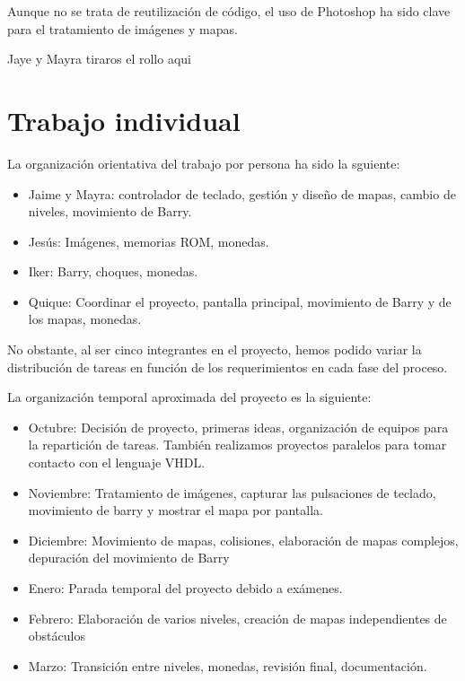 \documentclass[11pt, a4paper, spanish, openright, twoside]{book}
\begin{document}
Aunque no se trata de reutilización de código, el uso de Photoshop ha sido clave para el tratamiento de imágenes y mapas.

Jaye y Mayra tiraros el rollo aqui



\section{Trabajo individual}
La organización orientativa del trabajo por persona ha sido la sguiente:
\begin{itemize}
\item Jaime y Mayra: controlador de teclado, gestión y diseño de mapas, cambio de niveles, movimiento de Barry.
\item Jesús: Imágenes, memorias ROM, monedas.
\item Iker: Barry, choques, monedas.
\item Quique: Coordinar el proyecto, pantalla principal, movimiento de Barry y de los mapas, monedas.
\end{itemize}
No obstante, al ser cinco integrantes en el proyecto, hemos podido variar la distribución de tareas en función de los requerimientos en cada fase del proceso. 

La organización temporal aproximada del proyecto es la siguiente:
\begin{itemize}
\item Octubre: Decisión de proyecto, primeras ideas, organización de equipos para la repartición de tareas. También realizamos proyectos paralelos para tomar contacto con el lenguaje VHDL.
\item Noviembre: Tratamiento de imágenes, capturar las pulsaciones de teclado, movimiento de barry y mostrar el mapa por pantalla.
\item Diciembre: Movimiento de mapas, colisiones, elaboración de mapas complejos, depuración del movimiento de Barry
\item Enero: Parada temporal del proyecto debido a exámenes.
\item Febrero: Elaboración de varios niveles, creación de mapas independientes de obstáculos
\item Marzo: Transición entre niveles, monedas, revisión final, documentación.
\end{itemize}
\end{document}
